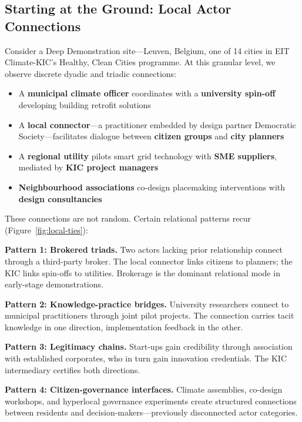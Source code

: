 \subsection{Starting at the Ground: Local Actor Connections}

Consider a Deep Demonstration site---Leuven, Belgium, one of 14 cities in EIT Climate-KIC's Healthy, Clean Cities programme. At this granular level, we observe discrete dyadic and triadic connections:

\begin{itemize}[noitemsep,topsep=2pt]
    \item A \textbf{municipal climate officer} coordinates with a \textbf{university spin-off} developing building retrofit solutions
    \item A \textbf{local connector}---a practitioner embedded by design partner Democratic Society---facilitates dialogue between \textbf{citizen groups} and \textbf{city planners}
    \item A \textbf{regional utility} pilots smart grid technology with \textbf{SME suppliers}, mediated by \textbf{KIC project managers}
    \item \textbf{Neighbourhood associations} co-design placemaking interventions with \textbf{design consultancies}
\end{itemize}

These connections are not random. Certain relational patterns recur (Figure~\ref{fig:local-ties}):

\textbf{Pattern 1: Brokered triads.} Two actors lacking prior relationship connect through a third-party broker. The local connector links citizens to planners; the KIC links spin-offs to utilities. Brokerage is the dominant relational mode in early-stage demonstrations.

\textbf{Pattern 2: Knowledge-practice bridges.} University researchers connect to municipal practitioners through joint pilot projects. The connection carries tacit knowledge in one direction, implementation feedback in the other.

\textbf{Pattern 3: Legitimacy chains.} Start-ups gain credibility through association with established corporates, who in turn gain innovation credentials. The KIC intermediary certifies both directions.

\textbf{Pattern 4: Citizen-governance interfaces.} Climate assemblies, co-design workshops, and hyperlocal governance experiments create structured connections between residents and decision-makers---previously disconnected actor categories.

